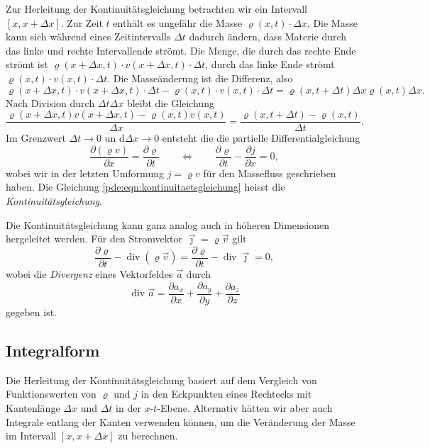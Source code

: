 Zur Herleitung der Kontinuitätsgleichung betrachten wir ein
Intervall $[x,x+\Delta x]$.
Zur Zeit $t$ enthält es ungefähr die Masse $\varrho(x,t)\cdot\Delta x$.
Die Masse kann sich während eines Zeitintervalls $\Delta t$ dadurch
ändern, dass Materie durch das linke und rechte Intervallende strömt.
Die Menge, die durch das rechte Ende strömt ist
$\varrho(x+\Delta x,t)\cdot v(x+\Delta x,t)\cdot \Delta t$,
durch das linke Ende strömt
$\varrho(x,t)\cdot v(x,t)\cdot \Delta t$.
Die Masseänderung ist die Differenz, also
\[
\varrho(x+\Delta x,t)\cdot v(x+\Delta x,t)\cdot \Delta t
-
\varrho(x,t)\cdot v(x,t)\cdot \Delta t
=
\varrho(x,t+\Delta t)\Delta x
\varrho(x,t)\Delta x.
\]
Nach Division durch $\Delta t\Delta x $ bleibt die Gleichung
\[
\frac{\varrho(x+\Delta x,t)v(x+\Delta x,t) - \varrho(x,t)v(x,t)}{\Delta x}
=
\frac{\varrho(x,t+\Delta t)-\varrho(x,t)}{\Delta t}.
\]
Im Grenzwert $\Delta t\to 0$ un d$\Delta x\to 0$ entsteht die
die partielle Differentialgleichung
\begin{equation}
\frac{\partial (\varrho v)}{\partial x} = \frac{\partial \varrho}{\partial t}
\qquad\Leftrightarrow\qquad
\frac{\partial\varrho}{\partial t} - \frac{\partial j}{\partial x}=0,
\label{pde:eqn:kontinuitaetsgleichung}
\end{equation}
wobei wir in der letzten Umformung $j=\varrho v$ für den Massefluss
geschrieben haben.
Die Gleichung \eqref{pde:eqn:kontinuitaetsgleichung} heisst die
{\em Kontinuitätsgleichung}.
%

Die Kontinuitätsgleichung kann ganz analog auch in höheren Dimensionen
hergeleitet werden.
Für den Stromvektor $\vec{\jmath}=\varrho\vec{v}$ gilt
\[
\frac{\partial \varrho}{\partial t}
-
\operatorname{div}(\varrho \vec{v})
=
\frac{\partial \varrho}{\partial t}
-
\operatorname{div}\vec{\jmath}
=
0,
\]
wobei die {\em Divergenz}
%
eines Vektorfeldes $\vec{a}$ durch
\[
\operatorname{div}\vec{a}
=
\frac{\partial a_x}{\partial x}
+
\frac{\partial a_y}{\partial y}
+
\frac{\partial a_z}{\partial z}
\]
gegeben ist.

\subsection{Integralform}
Die Herleitung der Kontinuitätsgleichung basiert auf dem Vergleich
von Funktionswerten von $\varrho$ und $j$ in den Eckpunkten eines
Rechtecks mit Kantenlänge $\Delta x$ und $\Delta t$ in der $x$-$t$-Ebene.
Alternativ hätten wir aber auch Integrale entlang der Kanten verwenden
können, um die Veränderung der Masse im Intervall $[x,x+\Delta x]$ 
zu berechnen.

